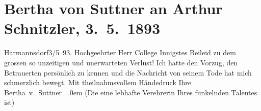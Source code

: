 

         
         \renewcommand{\erwaehntePersonen}{Personen: Johann Schnitzler}
         \renewcommand{\erwaehnteOrte}{Orte: Harmannsdorf, Wien}
         \renewcommand{\erwaehnteWerke}{}
               \section[Bertha von Suttner an Arthur Schnitzler, 3. 5. 1893]{ Bertha von Suttner an Arthur Schnitzler, 3. 5. 1893}\nopagebreak{}\rehead{ }\begin{ledgroupsized}[t]{13cm}\normalsize\beginnumbering \toendnotes[C]{\smallbreak\pagebreak[2]} 
\toendnotes[C]{\smallbreak}\pstart
           \noindent{}{\pb}\textcolor{gray}{\textbf{\label{T_L00210-1v}\label{T_L00210-1h}}}\hfill Harmannsdorf3/5 93.\pend
           \pstart{}Hochgeehrter Herr College\pend\pstart
           Innigstes Beileid zu dem grossen so unzeitigen und unerwarteten Verlust! Ich
                    hatte den Vorzug, den Betrauerten persönlich zu kennen und die Nachricht von seinem Tode hat
                    mich schmerzlich bewegt. Mit theilnahms{\pb}vollem Händedruck\pend
           \pstart
           Ihre{\\[\baselineskip]}\spacefill\mbox{Bertha v. Suttner}\pend
           \leftskip=0em{}\pstart
           \noindent{}(Die eine lebhafte Verehrerin Ihres funkelnden Talentes ist)\pend
           
         
         \endnumbering{}\end{ledgroupsized}  \newcommand{\dateiname}{L00210}\newcommand{\titel}{Bertha von Suttner an Arthur Schnitzler, 3. 5. 1893}\newcommand{\editorInnen}{Martin Anton Müller und Gerd-Hermann Susen}
      